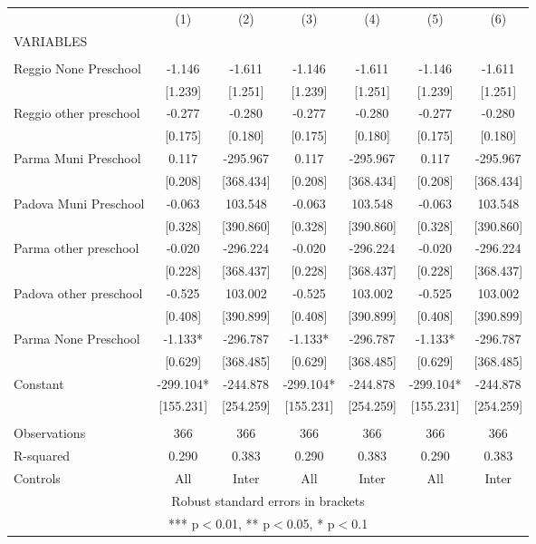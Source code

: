 \begin{tabular}{lcccccc} \hline
 & (1) & (2) & (3) & (4) & (5) & (6) \\
VARIABLES &  &  &  &  &  &  \\ \hline
 &  &  &  &  &  &  \\
Reggio None Preschool & -1.146 & -1.611 & -1.146 & -1.611 & -1.146 & -1.611 \\
 & [1.239] & [1.251] & [1.239] & [1.251] & [1.239] & [1.251] \\
Reggio other preschool & -0.277 & -0.280 & -0.277 & -0.280 & -0.277 & -0.280 \\
 & [0.175] & [0.180] & [0.175] & [0.180] & [0.175] & [0.180] \\
Parma Muni Preschool & 0.117 & -295.967 & 0.117 & -295.967 & 0.117 & -295.967 \\
 & [0.208] & [368.434] & [0.208] & [368.434] & [0.208] & [368.434] \\
Padova Muni Preschool & -0.063 & 103.548 & -0.063 & 103.548 & -0.063 & 103.548 \\
 & [0.328] & [390.860] & [0.328] & [390.860] & [0.328] & [390.860] \\
Parma other preschool & -0.020 & -296.224 & -0.020 & -296.224 & -0.020 & -296.224 \\
 & [0.228] & [368.437] & [0.228] & [368.437] & [0.228] & [368.437] \\
Padova other preschool & -0.525 & 103.002 & -0.525 & 103.002 & -0.525 & 103.002 \\
 & [0.408] & [390.899] & [0.408] & [390.899] & [0.408] & [390.899] \\
Parma None Preschool & -1.133* & -296.787 & -1.133* & -296.787 & -1.133* & -296.787 \\
 & [0.629] & [368.485] & [0.629] & [368.485] & [0.629] & [368.485] \\
Constant & -299.104* & -244.878 & -299.104* & -244.878 & -299.104* & -244.878 \\
 & [155.231] & [254.259] & [155.231] & [254.259] & [155.231] & [254.259] \\
 &  &  &  &  &  &  \\
Observations & 366 & 366 & 366 & 366 & 366 & 366 \\
R-squared & 0.290 & 0.383 & 0.290 & 0.383 & 0.290 & 0.383 \\
 Controls & All & Inter & All & Inter & All & Inter \\ \hline
\multicolumn{7}{c}{ Robust standard errors in brackets} \\
\multicolumn{7}{c}{ *** p$<$0.01, ** p$<$0.05, * p$<$0.1} \\
\end{tabular}

